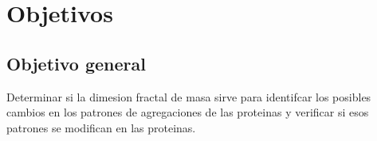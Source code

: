 \documentclass[11pt]{article}
\begin{document}

\clearpage

\section{Objetivos}
\subsection{Objetivo general}
Determinar si la dimesion fractal de masa sirve para identifcar los posibles cambios en los patrones de agregaciones de las proteinas y verificar si esos patrones se modifican en las proteinas.
\end{document}
